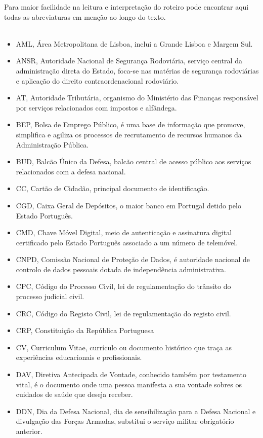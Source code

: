 Para maior facilidade na leitura e interpretação do roteiro pode
encontrar aqui todas as abreviaturas em menção ao longo do texto. \\
\\
\begin{itemize}
	\item AML, Área Metropolitana de Lisboa, inclui a Grande Lisboa e Margem Sul.
	\item ANSR, Autoridade Nacional de Segurança Rodoviária, serviço central da administração direta do Estado, foca-se nas matérias de segurança rodoviárias e aplicação do direito contraordenacional rodoviário.
	\item AT, Autoridade Tributária, organismo do Ministério das Finanças responsável por serviços relacionados com impostos e alfândega.
	\item BEP, Bolsa de Emprego Público, é uma base de informação que promove, simplifica e agiliza os processos de recrutamento de recursos humanos da Administração Pública.
	\item BUD, Balcão Único da Defesa, balcão central de acesso público aos serviços relacionados com a defesa nacional.
	\item CC, Cartão de Cidadão, principal documento de identificação.
	\item CGD, Caixa Geral de Depósitos, o maior banco em Portugal detido pelo Estado Português.
	\item CMD, Chave Móvel Digital, meio de autenticação e assinatura digital certificado pelo Estado Português associado a um número de telemóvel.
	\item CNPD, Comissão Nacional de Proteção de Dados, é autoridade nacional de controlo de dados pessoais dotada de independência administrativa.
	\item CPC, Código do Processo Civil, lei de regulamentação do trânsito do processo judicial civil.
	\item CRC, Código do Registo Civil, lei de regulamentação do registo civil.
	\item CRP, Constituição da República Portuguesa
	\item CV, Curriculum Vitae, currículo ou documento histórico que traça as experiências educacionais e profissionais.
	\item DAV, Diretiva Antecipada de Vontade, conhecido também por testamento vital, é o documento onde uma pessoa manifesta a sua vontade sobres os cuidados de saúde que deseja receber.
	\item DDN, Dia da Defesa Nacional, dia de sensibilização para a Defesa Nacional e divulgação das Forças Armadas, substitui o serviço militar obrigatório anterior.

\end{itemize}
